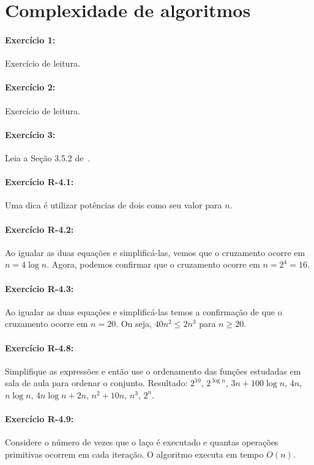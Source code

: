 \section{Complexidade de algoritmos}

\paragraph{Exercício 1:}
Exercício de leitura.

\paragraph{Exercício 2:}
Exercício de leitura.

\paragraph{Exercício 3:}
Leia a Seção 3.5.2 de~\cite{GoodrichAndTamassia2013}.

\paragraph{Exercício R-4.1:}
Uma dica é utilizar potências de dois como seu valor para $n$.

\paragraph{Exercício R-4.2:}
Ao igualar as duas equações e simplificá-las, vemos que o cruzamento ocorre em $n = 4 \log n$. Agora, podemos confirmar que o cruzamento ocorre em $n = 2^4 = 16$.

\paragraph{Exercício R-4.3:}
Ao igualar as duas equações e simplificá-las temos a confirmação de que o cruzamento ocorre em $n = 20$. Ou seja, $40 n^2 \le 2n^3$ para $n \ge 20$.

\paragraph{Exercício R-4.8:}
Simplifique as expressões e então use o ordenamento das funções estudadas em sala de aula para ordenar o conjunto. Resultado: $2^{10}$, $2^{\log n}$, $3n + 100 \log n$, $4n$, $n \log n$, $4n \log n + 2n$, $n^2 + 10n$, $n^3$, $2^n$.

\paragraph{Exercício R-4.9:}
Considere o número de vezes que o laço é executado e quantas operações primitivas ocorrem em cada iteração. O algoritmo executa em tempo $O(n)$.

